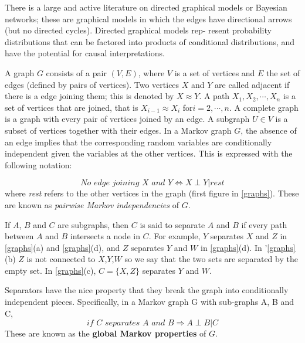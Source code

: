 \documentclass[12pt, letterpaper]{article}
\theoremstyle{definition}
\begin{document}
There is a large and active literature on directed graphical models or Bayesian networks; these are graphical models in which the edges have directional arrows (but no directed cycles). Directed graphical models rep- resent probability distributions that can be factored into products of conditional distributions, and have the potential for causal interpretations.

 A graph $G$ consists of a pair $(V, E)$, where $V$ is a set of vertices and $E$ the set of edges (defined by pairs of vertices). Two vertices $X$ and $Y$ are called adjacent if there is a edge joining them; this is denoted by $X \approx Y$. A path $X_1,X_2,\cdots,X_n$ is a set of vertices that are joined, that is $X_{i-1} \approx X_i$ for$ i = 2,\cdots,n$. A complete graph is a graph with every pair of vertices joined by an edge. A subgraph $U \in V$ is a subset of vertices together with their edges.
In a Markov graph $G$, the absence of an edge implies that the corresponding random variables are conditionally independent given the variables at the other vertices. This is expressed with the following notation:

\begin{equation}
\textit{No edge joining $X$ and $Y$} \Longleftrightarrow  X \perp Y|rest
\end{equation}
where \textit{rest} refers to the other vertices in the graph (first figure in \autoref{graphs}). These are known as \textit{pairwise Markov independencies} of $G$.

If $A$, $B$ and $C$ are subgraphs, then $C$ is said to separate $A$ and $B$ if every path between $A$ and $B$ intersects a node in $C$. For example, $Y$ separates $X$ and $Z$ in \autoref{graphs}(a) and \autoref{graphs}(d), and $Z$ separates $Y$ and $W$ in \autoref{graphs}(d). In '\autoref{graphs}(b) $Z$ is not connected to $X$,$Y$,$W$ so we say that the two sets are separated by the empty set. In \autoref{graphs}(c), $C = \{X,Z\}$ separates $Y$ and $W$.

Separators have the nice property that they break the graph into conditionally independent pieces. Specifically, in a Markov graph G with sub-graphs A, B and C,
\begin{equation}
\textit{if $C$ separates $A$ and $B$} \Rightarrow A\perp B|C
\end{equation}
These are known as the \textbf{global Markov properties} of $G$.
\end{document}
